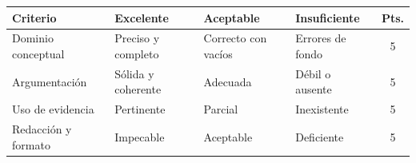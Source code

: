 \documentclass{academic-report}
\begin{document}
\encabezado

\begin{table}[h]\centering\small
\begin{tabularx}{\linewidth}{@{}l Y Y Y c@{}}
\toprule
\textbf{Criterio} & \textbf{Excelente} & \textbf{Aceptable} & \textbf{Insuficiente} & \textbf{Pts.} \\\midrule
Dominio conceptual & Preciso y completo & Correcto con vacíos & Errores de fondo & 5 \\
Argumentación      & Sólida y coherente & Adecuada           & Débil o ausente   & 5 \\
Uso de evidencia   & Pertinente         & Parcial            & Inexistente       & 5 \\
Redacción y formato& Impecable          & Aceptable          & Deficiente        & 5 \\
\bottomrule
\end{tabularx}
\end{table}
\end{document}
